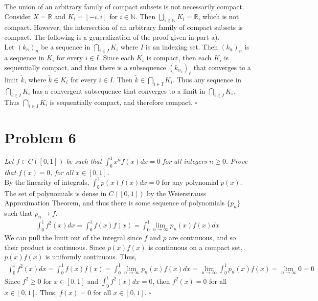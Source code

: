 \documentclass[12pt]{article}
\begin{document}
The union of an arbitrary family of compact subsets is not necessarily compact.  Consider $X = \mathbb{R}$ and $K_i = [-i, i]$ for $i\in \mathbb{N}$.  Then $\bigcup_{i\in\mathbb{N}}K_i = \mathbb{R}$, which is not compact.  However, the intersection of an arbitrary family of compact subsets is compact.  The following is a generalization of the proof given in part a). \\

Let $(k_n)_n$ be a sequence in $\bigcap_{i\in I} K_i$ where $I$ is an indexing set.  Then $(k_n)_n$ is a sequence in $K_i$ for every $i\in I$.  Since each $K_i$ is compact, then each $K_i$ is sequentially compact, and thus there is a subsequence $(k_{n_\ell})_\ell$ that converges to a limit $\tilde{k}$, where $\tilde{k} \in K_i$ for every $i\in I$.  Then $\tilde{k} \in \bigcap_{i\in I} K_i$.  Thus any sequence in $\bigcap_{i\in I} K_i$ has a convergent subsequence that converges to a limit in $\bigcap_{i\in I} K_i$.  Thus $\bigcap_{i\in I} K_i$ is sequentially compact, and therefore compact. \hfill $\square$

\section*{Problem 6}
{\it Let $f \in C([0,1])$ be such that $\int_0^1x^nf(x)dx = 0$ for all integers $n \geq 0$.  Prove that $f(x) = 0$, for all $x \in [0,1]$.} \\

By the linearity of integrals, $\int_0^1 p(x) f(x) dx = 0$ for any polynomial $p(x)$.  The set of polynomials is dense in $C([0,1])$ by the Weierstrauss Approximation Theorem, and thus there is some sequence of polynomials $\{p_n\}$ such that $p_n \rightarrow f$.
\begin{align*}
  \int_0^1 f^2(x)dx = \int_0^1 f(x) f(x) = \int_0^1 \lim\limits_{n\rightarrow \infty} p_n(x) f(x) dx
\end{align*}
We can pull the limit out of the integral since $f$ and $p$ are continuous, and so their product is continuous.  Since $p(x)f(x)$ is continuous on a compact set, $p(x)f(x)$ is uniformly continuous.  Thus,
\begin{align*}
  \int_0^1 f^2(x)dx = \int_0^1 f(x) f(x) = \int_0^1 \lim\limits_{n\rightarrow \infty} p_n(x) f(x) dx = \lim\limits_{n\rightarrow\infty}\int_0^1 p_n(x) f(x) = \lim\limits_{n\rightarrow\infty} 0 = 0
\end{align*}
Since $f^2 \geq 0 $ for $x \in [0,1]$ and $\int_0^1 f^2(x) dx = 0$, then $f^2(x) = 0$ for all $x \in [0,1]$.  Thus, $f(x) = 0$ for all $x \in [0,1]$. \hfill $\square$
\end{document}
